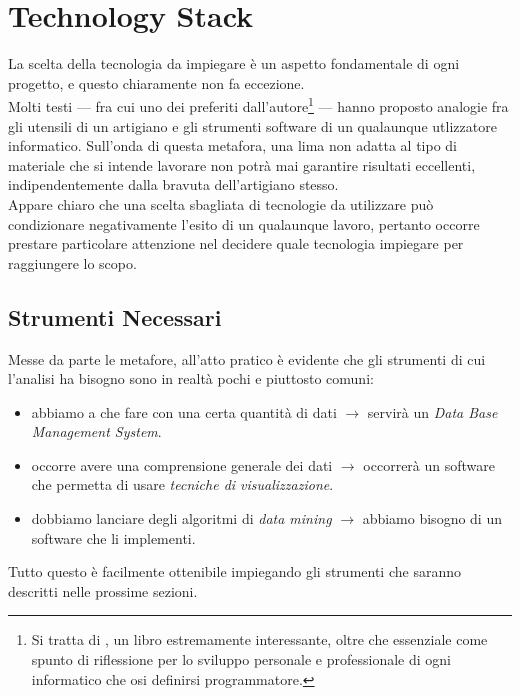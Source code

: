 \chapter{Technology Stack}
\label{ch:tech}

La scelta della tecnologia da impiegare è un aspetto fondamentale di ogni progetto, e questo chiaramente non fa eccezione. \\

Molti testi --- fra cui uno dei preferiti dall'autore\footnote{Si tratta di \cite{pragmatic}, un libro estremamente interessante, oltre che essenziale come spunto di riflessione per lo sviluppo personale e professionale di ogni informatico che osi definirsi programmatore.} --- hanno proposto analogie fra gli utensili di un artigiano e gli strumenti software di un qualaunque utlizzatore informatico. Sull'onda di questa metafora, una lima non adatta al tipo di materiale che si intende lavorare non potrà mai garantire risultati eccellenti, indipendentemente dalla bravuta dell'artigiano stesso. \\

Appare chiaro che una scelta sbagliata di tecnologie da utilizzare può condizionare negativamente l'esito di un qualaunque lavoro, pertanto occorre prestare particolare attenzione nel decidere quale tecnologia impiegare per raggiungere lo scopo.

\section{Strumenti Necessari}

    Messe da parte le metafore, all'atto pratico è evidente che gli strumenti di cui l'analisi ha bisogno sono in realtà pochi e piuttosto comuni:

    \begin{itemize}
        \item abbiamo a che fare con una certa quantità di dati $\rightarrow$ servirà un \textit{Data Base Management System}.
        \item occorre avere una comprensione generale dei dati $\rightarrow$ occorrerà un software che permetta di usare \textit{tecniche di visualizzazione}.
        \item dobbiamo lanciare degli algoritmi di \textit{data mining} $\rightarrow$ abbiamo bisogno di un software che li implementi.
    \end{itemize}

    Tutto questo è facilmente ottenibile impiegando gli strumenti che saranno descritti nelle prossime sezioni.

